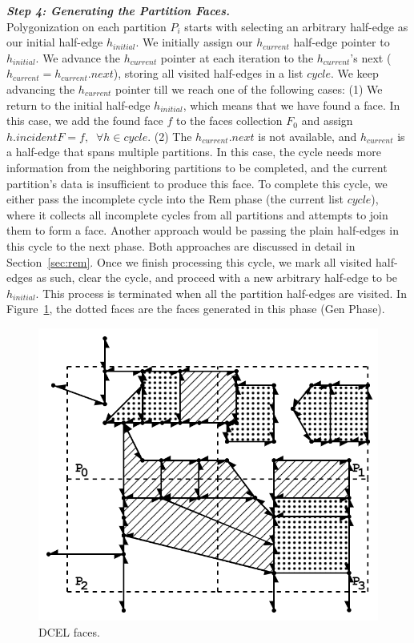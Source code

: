 \vspace{4pt}
\textit{\textbf{Step 4: Generating the Partition Faces.}}
\\
Polygonization on each partition $P_i$ starts with selecting an arbitrary half-edge as our initial half-edge $h_{initial}$.
We initially assign our $h_{current}$ half-edge pointer to $h_{initial}$. We advance the $h_{current}$ pointer at each iteration to the $h_{current}$'s next ($h_{current} = h_{current}.next$), storing all visited half-edges in a list $cycle$. We keep advancing the $h_{current}$ pointer till we reach one of the following cases:
(1) We return to the initial half-edge $h_{initial}$, which means that we have found a face. In this case, we add the found face $f$ to the faces collection $F_0$ and assign $h.incidentF = f, \;\; \forall h \in cycle$.
(2) The $h_{current}.next$ is not available, and $h_{current}$ is a half-edge that spans multiple partitions. In this case, the cycle needs more information from the neighboring partitions to be completed, and the current partition's data is insufficient to produce this face.
To complete this cycle, we either pass the incomplete cycle into the Rem phase (the current list $cycle$), where it collects all incomplete cycles from all partitions and attempts to join them to form a face. Another approach would be passing the plain half-edges in this cycle to the next phase. Both approaches are discussed in detail in Section~\ref{sec:rem}.
Once we finish processing this cycle, we mark all visited half-edges as such, clear the cycle, and proceed with a new arbitrary half-edge to be $h_{initial}$.
This process is terminated when all the partition half-edges are visited.
In Figure~\ref{fig:ddcel:faces}, the dotted faces are the faces generated in this phase (Gen Phase).

\begin{figure}[tb]
	\centering
	\includegraphics[width=0.75 \linewidth ]{chapter2/model/ddcel-3.png}
	\caption{DCEL faces.}
	\label{fig:ddcel:faces}
\end{figure}
